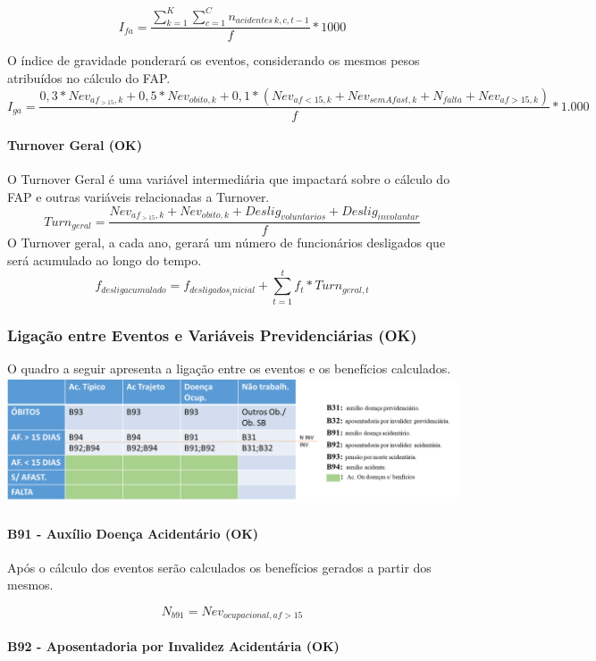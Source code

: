 \documentclass[]{article}
\let\oldparagraph\paragraph
\renewcommand{\paragraph}[1]{\oldparagraph{#1}\mbox{}}
\begin{document}
\[I_{fa} = \frac{\sum_{k=1}^{K} {\sum_{c=1}^{C} {n_{acidentes \ k,c, t-1}}}}{f} * 1000\]

O índice de gravidade ponderará os eventos, considerando os mesmos pesos
atribuídos no cálculo do FAP.
\[I_{ga} = \frac{0,3 * Nev_{af_{>15},k} + 0,5 * Nev_{obito, k} + 0,1 * (Nev_{af<15,k} + Nev_{semAfast,k} + N_{falta} + Nev_{af>15,k})}{f}* 1.000\]

\paragraph{Turnover Geral (OK)}\label{turnover-geral-ok}

O Turnover Geral é uma variável intermediária que impactará sobre o
cálculo do FAP e outras variáveis relacionadas a Turnover.
\[Turn_{geral} = \frac{Nev_{af_{>15},k} + Nev_{obito,k} + Deslig_{voluntarios} + Deslig_{involuntar}}{f}\]
O Turnover geral, a cada ano, gerará um número de funcionários
desligados que será acumulado ao longo do tempo.
\[f_{desligacumulado} = f_{desligados_inicial} + \sum_{t=1}^{t} f_t * Turn_{geral,t} \]

\subsubsection{Ligação entre Eventos e Variáveis Previdenciárias
(OK)}\label{ligacao-entre-eventos-e-variaveis-previdenciarias-ok}

O quadro a seguir apresenta a ligação entre os eventos e os benefícios
calculados. \includegraphics{../figures/quadro_beneficios.png}

\paragraph{B91 - Auxílio Doença Acidentário
(OK)}\label{b91---auxilio-doenca-acidentario-ok}

Após o cálculo dos eventos serão calculados os benefícios gerados a
partir dos mesmos.

\[N_{b91} = Nev_{ocupacional, af>15}\]

\paragraph{B92 - Aposentadoria por Invalidez Acidentária
(OK)}\label{b92---aposentadoria-por-invalidez-acidentaria-ok}
\end{document}
